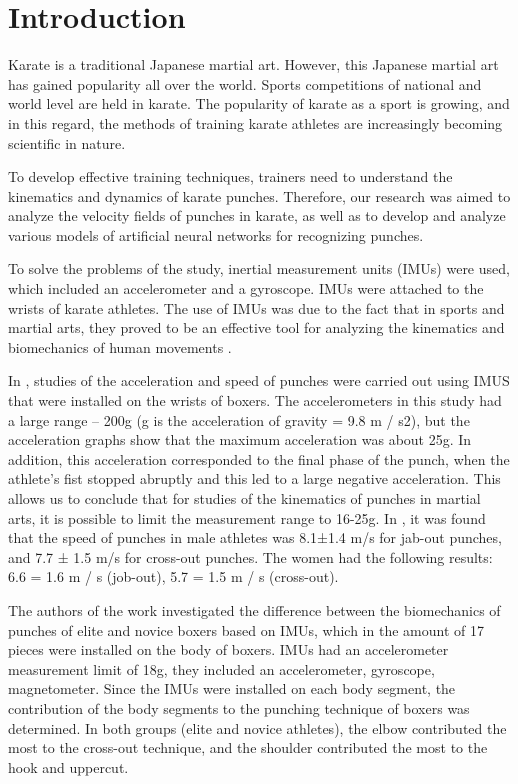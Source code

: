 \documentclass[sport,article,submit,moreauthors,pdftex]{Definitions/mdpi}
\begin{document}
\section{Introduction}
Karate is a traditional Japanese martial art. However, this Japanese martial art has gained popularity all over the world. Sports competitions of national and world level are held in karate. The popularity of karate as a sport is growing, and in this regard, the methods of training karate athletes are increasingly becoming scientific in nature.

To develop effective training techniques, trainers need to understand the kinematics and dynamics of karate punches. Therefore, our research was aimed to analyze the velocity fields of punches in karate, as well as to develop and analyze various models of artificial neural networks for recognizing punches.

To solve the problems of the study, inertial measurement units (IMUs) were used, which included an accelerometer and a gyroscope. IMUs were attached to the wrists of karate athletes. The use of IMUs was due to the fact that in sports and martial arts, they proved to be an effective tool for analyzing the kinematics and biomechanics of human movements \cite{ref-journal1, ref-journal2}.

In \cite{ref-journal3}, studies of the acceleration and speed of punches were carried out using IMUS that were installed on the wrists of boxers. The accelerometers in this study had a large range – 200g (g is the acceleration of gravity = 9.8 m / s2), but the acceleration graphs show that the maximum acceleration was about 25g. In addition, this acceleration corresponded to the final phase of the punch, when the athlete's fist stopped abruptly and this led to a large negative acceleration. This allows us to conclude that for studies of the kinematics of punches in martial arts, it is possible to limit the measurement range to 16-25g. In \cite{ref-journal3}, it was found that the speed of punches in male athletes was 8.1±1.4 m/s for jab-out punches, and 7.7 ± 1.5 m/s for cross-out punches. The women had the following results: 6.6 = 1.6 m / s (job-out), 5.7 = 1.5 m / s (cross-out).

The authors of the work \cite{ref-journal4} investigated the difference between the biomechanics of punches of elite and novice boxers based on IMUs, which in the amount of 17 pieces were installed on the body of boxers. IMUs had an accelerometer measurement limit of 18g, they included an accelerometer, gyroscope, magnetometer. Since the IMUs were installed on each body segment, the contribution of the body segments to the punching technique of boxers was determined. In both groups (elite and novice athletes), the elbow contributed the most to the cross-out technique, and the shoulder contributed the most to the hook and uppercut.
\end{document}
